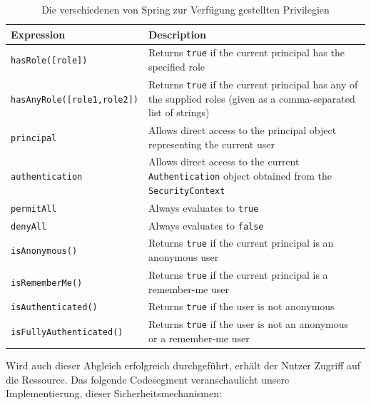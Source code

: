 \begin{table}[hbt]
 \caption{Die verschiedenen von Spring zur Verfügung gestellten Privilegien}
  \begin{tabular}{lp{9.5cm}}
    \toprule 
    \textbf{Expression} & \textbf{Description} \\
    \hline
    \texttt{hasRole([role])} & Returns \texttt{true} if the current principal has the specified role \\
    \texttt{hasAnyRole([role1,role2])} & Returns \texttt{true} if the current principal has any of the supplied roles (given as a comma-separated list of strings) \\
	\texttt{principal} & Allows direct access to the principal object representing the current user \\
	\texttt{authentication} & 	Allows direct access to the current \texttt{Authentication} object obtained from the \texttt{SecurityContext} \\
	\texttt{permitAll} & Always evaluates to \texttt{true} \\
	\texttt{denyAll} & Always evaluates to \texttt{false} \\
	\texttt{isAnonymous()} & Returns \texttt{true} if the current principal is an anonymous user \\
	\texttt{isRememberMe()} & Returns \texttt{true} if the current principal is a remember-me user \\
	\texttt{isAuthenticated()} & Returns \texttt{true} if the user is not anonymous \\
	\texttt{isFullyAuthenticated()} & Returns \texttt{true} if the user is not an anonymous or a remember-me user \\
	\bottomrule
  \end{tabular}
\end{table} 
\bigskip
Wird auch dieser Abgleich erfolgreich durchgeführt, erhält der Nutzer Zugriff auf die Ressource. Das 
folgende Codesegment veranschaulicht unsere Implementierung, dieser Sicherheitsmechanismen: \\

